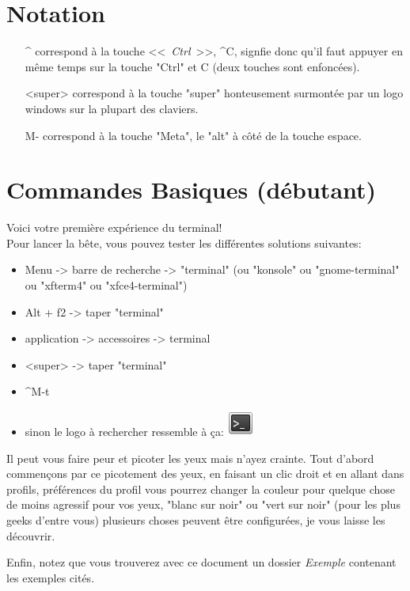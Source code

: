 \documentclass[french, a4paper, 12pt, titlepage]{article}
\begin{document}
\section{Notation}
\begin{enumerate}
\item[\^{}] correspond à la touche <<~\emph{Ctrl}~>>, \^{}C, signfie donc qu'il faut appuyer en même temps sur la touche "Ctrl" et C (deux touches sont enfoncées).
\item [<super>] correspond à la touche "super" honteusement surmontée par un logo windows sur la plupart des claviers.
\item [M-] correspond à la touche "Meta", le "alt" à côté de la touche espace.
\end{enumerate}

\newpage
\section{Commandes Basiques (débutant)}
\noindent Voici votre première expérience du terminal!\\
Pour lancer la bête, vous pouvez tester les différentes solutions suivantes:
\begin{itemize}
\item Menu -> barre de recherche -> "terminal" (ou "konsole" ou "gnome-terminal" ou "xfterm4" ou "xfce4-terminal")
\item Alt + f2 -> taper "terminal"
\item application -> accessoires -> terminal
\item <super>  -> taper "terminal"
\item \^{}M-t
\item sinon le logo à rechercher ressemble à ça:  \includegraphics[scale=0.7]{Images/termIcon}
\end{itemize}
Il peut vous faire peur et picoter les yeux mais n'ayez crainte. Tout d'abord commençons par ce picotement des yeux, en faisant un clic droit et en allant dans profils, préférences du profil vous pourrez changer la couleur pour quelque chose de moins agressif pour vos yeux, "blanc sur noir" ou "vert sur noir" (pour les plus geeks d'entre vous) plusieurs choses peuvent être configurées, je vous laisse les découvrir.

Enfin, notez que vous trouverez avec ce document un dossier \emph{Exemple} contenant les exemples cités.
\end{document}
